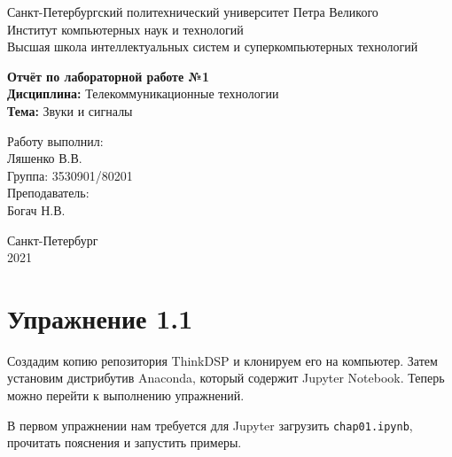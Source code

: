 \documentclass[a4paper,12pt]{report}
\begin{document}
 

\begin{titlepage}
\newpage
	\begin{center}
		\large Санкт-Петербургский политехнический университет Петра Великого\\
		Институт компьютерных наук и технологий\\
		Высшая школа интеллектуальных систем и суперкомпьютерных технологий\\
	\end{center}
\vspace{7cm}

\begin{center}
		\large \textbf{Отчёт по лабораторной работе №1} \\
		\textbf{Дисциплина:} Телекоммуникационные технологии\\
		\textbf{Тема:} Звуки и сигналы
\end{center}
\vspace{4cm}
	
\begin{flushright}
		\large Работу выполнил:\\ Ляшенко В.В.\\
		Группа: 3530901/80201\\
		Преподаватель:\\ Богач Н.В.
\end{flushright}

\vspace{\fill}
\begin{center}
	\large Санкт-Петербург\\ 2021
	\end{center}
\end{titlepage}

\tableofcontents
\listoffigures
\lstlistoflistings

\chapter{Упражнение 1.1}
    Создадим копию репозитория ThinkDSP и клонируем его на компьютер. Затем установим дистрибутив Anaconda, который содержит Jupyter Notebook. Теперь можно перейти к выполнению упражнений.
    
    В первом упражнении нам требуется для Jupyter загрузить \texttt{chap01.ipynb}, прочитать пояснения и запустить примеры.
    
\end{document}
